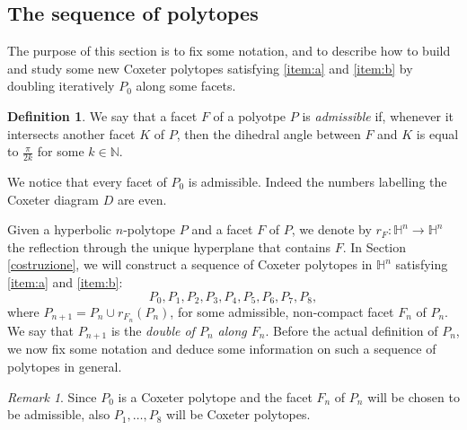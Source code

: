 \documentclass{amsart}
\theoremstyle{definition}
\newtheorem{defn}[lemma]{Definition}
\theoremstyle{remark}
\newtheorem{rem}[lemma]{Remark}
\newcommand{\matN}{\ensuremath {\mathbb{N}}}
\newcommand{\matR} {\ensuremath {\mathbb{R}}}
\newcommand{\matH} {\ensuremath {\mathbb{H}}}
\newcommand{\matS} {\ensuremath {\mathbb{S}}}
\begin{document}
\subsection{The sequence of polytopes}\label{P7eP8} The purpose of this section is to fix some notation, and to describe how to build and study some new Coxeter polytopes satisfying \ref{item:a} and \ref{item:b} by doubling iteratively $P_0$ along some facets.





\begin{defn}
We say that a facet $F$ of a polyotpe $P$ is \emph{admissible} if, whenever it intersects another facet $K$ of $P$, then the dihedral angle between $F$ and $K$ is equal to $\frac{\pi}{2k}$ for some $k\in\matN$.
\end{defn}

We notice that every facet of $P_0$ is admissible. Indeed the numbers labelling the Coxeter diagram $D$ are even.

Given a  hyperbolic $n$-polytope $P$ and a facet $F$ of $P$, we denote by $r_F\colon\matH^n\rightarrow \matH^n$ the reflection through the unique hyperplane that contains $F$.
In Section \ref{costruzione}, we will construct a sequence of Coxeter polytopes in $\matH^n$ satisfying \ref{item:a} and \ref{item:b}:
$$
P_0,P_1,P_2,P_3,P_4,P_5,P_6,P_7,P_8,
$$
where $P_{n+1}=P_n\cup r_{F_n}(P_n)$, for some admissible, non-compact facet $F_n$ of $P_n$.
We say that $P_{n+1}$ is the \emph{double of $P_n$ along $F_n$}. Before the actual definition of $P_n$, we now fix some notation and deduce some information on such a sequence of polytopes in general. 

\begin{rem}
    Since $P_0$ is a Coxeter polytope and the facet $F_n$ of $P_n$ will be chosen to be admissible, also $P_1,\dots,P_8$ will be Coxeter polytopes.
\end{rem}
\end{document}

